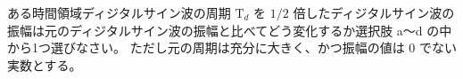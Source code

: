 ある時間領域ディジタルサイン波の周期 $\textrm{T}_d$ を $1/2$ 倍したディジタルサイン波の振幅は元のディジタルサイン波の振幅と比べてどう変化するか選択肢 a〜d の中から1つ選びなさい。
ただし元の周期は充分に大きく、かつ振幅の値は $0$ でない実数とする。
